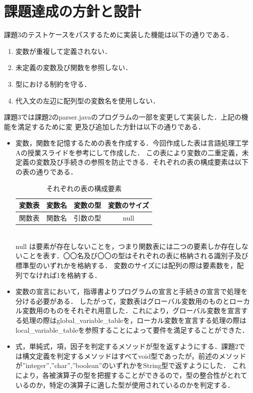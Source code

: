 \documentclass[dvipdfmx]{jarticle}
\begin{document}
\section{課題達成の方針と設計}
課題3のテストケースをパスするために実装した機能は以下の通りである．
\begin{enumerate}
  \item 変数が重複して定義されない．
  \item 未定義の変数及び関数を参照しない．
  \item 型における制約を守る．
  \item 代入文の左辺に配列型の変数名を使用しない．
\end{enumerate}
課題3では課題2のparser.javaのプログラムの一部を変更して実装した．上記の機能を満足するために変
更及び追加した方針は以下の通りである．
\begin{itemize}
  \item 変数，関数を記憶するための表を作成する．今回作成した表は言語処理工学Aの授業スライドを参考にして作成した．
  この表により変数の二重定義，未定義の変数及び手続きの参照を防止できる．それぞれの表の構成要素は以下の表の通りである．
  \begin{table}[h]
    \centering
    \begin{tabular}{|c||c|c|c|}
      \hline
      変数表 & 変数名 & 変数の型 & 変数のサイズ\\\hline
      関数表 & 関数名 & 引数の型 & null\\\hline
    \end{tabular}
    \caption{それぞれの表の構成要素}
  \end{table}
  \\null は要素が存在しないことを，つまり関数表には二つの要素しか存在しないことを表す．〇〇名及び〇〇の型はそれぞれの表に格納される識別子及び標準型のいずれかを格納する．
  変数のサイズには配列の際は要素数を，配列でなければ1を格納する．
  \item 変数の宣言において，指導書よりプログラムの宣言と手続きの宣言で処理を分ける必要がある．
  したがって，変数表はグローバル変数用のものとローカル変数用のものをそれぞれ用意した．これにより，グローバル変数を宣言する処理の際はglobal\_variable\_tableを，ローカル変数を宣言する処理の際はlocal\_variable\_tableを参照することによって要件を満足することができた．
  \item 式，単純式，項，因子を判定するメソッドが型を返すようにする．課題2では構文定義を判定するメソッドはすべてvoid型であったが，前述のメソッドが”integer”,”char”,”boolean”のいずれかをString型で返すようにした．
  これにより，各被演算子の型を把握することができるので，型の整合性がとれているのか，特定の演算子に適した型が使用されているのかを判定する．
\end{itemize}
\end{document}
